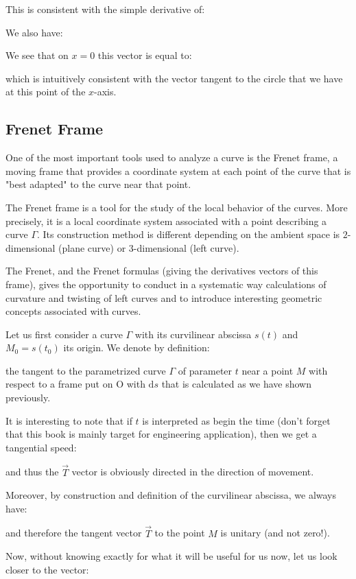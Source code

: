 {\begin{tcolorbox}[colframe=black,colback=white,sharp corners]
	This is consistent with the simple derivative of:
	
	We also have:
	
	We see that on $x=0$ this vector is equal to:
	
	which is intuitively consistent with the vector tangent to the circle that we have at this point of the $x$-axis.
	\end{tcolorbox}
	
	\pagebreak
	\subsection{Frenet Frame}\label{frenet frame}
	One of the most important tools used to analyze a curve is the Frenet frame, a moving frame that provides a coordinate system at each point of the curve that is "best adapted" to the curve near that point.
	
	The Frenet frame is a tool for the study of the local behavior of the curves. More precisely, it is a local coordinate system associated with a point describing a curve $\Gamma$. Its construction method is different depending on the ambient space is $2$-dimensional (plane curve) or $3$-dimensional (left curve).
	
	The Frenet, and the Frenet formulas (giving the derivatives vectors of this frame), gives the opportunity to conduct in a systematic way calculations of curvature and twisting of left curves and to introduce interesting geometric concepts associated with curves.
	
	Let us first consider a curve $\Gamma$ with its curvilinear abscissa $s(t)$ and $M_0=s(t_0)$ its origin. We denote by definition:
	
	the tangent to the parametrized curve $\Gamma$ of parameter $t$ near a point $M$ with respect to a frame put on O with $\mathrm{d}s$ that is calculated as we have shown previously.
	
	It is interesting to note that if $t$ is interpreted as begin the time (don't forget that this book is mainly target for engineering application), then we get a tangential speed:
	
	and thus the  $\vec{T}$ vector is obviously directed in the direction of movement.
	
	Moreover, by construction and definition of the curvilinear abscissa, we always have:
	
	and therefore the tangent vector $\vec{T}$ to the point $M$ is unitary (and not zero!).
	
	Now, without knowing exactly for what it will be useful for us now, let us look closer to the vector:
	
}

